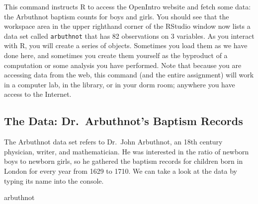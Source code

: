 \documentclass[
]{article}
\newenvironment{Shaded}{\begin{snugshade}}{\end{snugshade}}
\newcommand{\NormalTok}[1]{#1}
\begin{document}
This command instructs R to access the OpenIntro website and fetch some
data: the Arbuthnot baptism counts for boys and girls. You should see
that the workspace area in the upper righthand corner of the RStudio
window now lists a data set called \texttt{arbuthnot} that has 82
observations on 3 variables. As you interact with R, you will create a
series of objects. Sometimes you load them as we have done here, and
sometimes you create them yourself as the byproduct of a computation or
some analysis you have performed. Note that because you are accessing
data from the web, this command (and the entire assignment) will work in
a computer lab, in the library, or in your dorm room; anywhere you have
access to the Internet.

\hypertarget{the-data-dr.-arbuthnots-baptism-records}{%
\subsection{The Data: Dr.~Arbuthnot's Baptism
Records}\label{the-data-dr.-arbuthnots-baptism-records}}

The Arbuthnot data set refers to Dr.~John Arbuthnot, an 18th century
physician, writer, and mathematician. He was interested in the ratio of
newborn boys to newborn girls, so he gathered the baptism records for
children born in London for every year from 1629 to 1710. We can take a
look at the data by typing its name into the console.

\begin{Shaded}
\begin{Highlighting}[]
\NormalTok{arbuthnot}
\end{Highlighting}
\end{Shaded}
\end{document}
